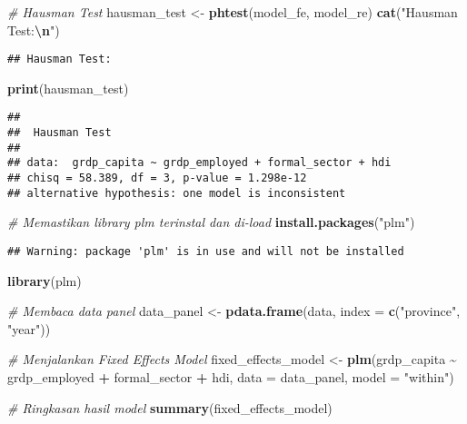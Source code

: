 \documentclass[
]{article}
\newenvironment{Shaded}{\begin{snugshade}}{\end{snugshade}}
\newcommand{\AttributeTok}[1]{\textcolor[rgb]{0.13,0.29,0.53}{#1}}
\newcommand{\CommentTok}[1]{\textcolor[rgb]{0.56,0.35,0.01}{\textit{#1}}}
\newcommand{\FunctionTok}[1]{\textcolor[rgb]{0.13,0.29,0.53}{\textbf{#1}}}
\newcommand{\NormalTok}[1]{#1}
\newcommand{\OtherTok}[1]{\textcolor[rgb]{0.56,0.35,0.01}{#1}}
\newcommand{\SpecialCharTok}[1]{\textcolor[rgb]{0.81,0.36,0.00}{\textbf{#1}}}
\newcommand{\StringTok}[1]{\textcolor[rgb]{0.31,0.60,0.02}{#1}}
\begin{document}
\begin{Shaded}
\begin{Highlighting}[]
\CommentTok{\# Hausman Test}
\NormalTok{hausman\_test }\OtherTok{\textless{}{-}} \FunctionTok{phtest}\NormalTok{(model\_fe, model\_re)}
\FunctionTok{cat}\NormalTok{(}\StringTok{"Hausman Test:}\SpecialCharTok{\textbackslash{}n}\StringTok{"}\NormalTok{)}
\end{Highlighting}
\end{Shaded}

\begin{verbatim}
## Hausman Test:
\end{verbatim}

\begin{Shaded}
\begin{Highlighting}[]
\FunctionTok{print}\NormalTok{(hausman\_test)}
\end{Highlighting}
\end{Shaded}

\begin{verbatim}
## 
##  Hausman Test
## 
## data:  grdp_capita ~ grdp_employed + formal_sector + hdi
## chisq = 58.389, df = 3, p-value = 1.298e-12
## alternative hypothesis: one model is inconsistent
\end{verbatim}

\begin{Shaded}
\begin{Highlighting}[]
\CommentTok{\# Memastikan library plm terinstal dan di{-}load}
\FunctionTok{install.packages}\NormalTok{(}\StringTok{"plm"}\NormalTok{)}
\end{Highlighting}
\end{Shaded}

\begin{verbatim}
## Warning: package 'plm' is in use and will not be installed
\end{verbatim}

\begin{Shaded}
\begin{Highlighting}[]
\FunctionTok{library}\NormalTok{(plm)}

\CommentTok{\# Membaca data panel}
\NormalTok{data\_panel }\OtherTok{\textless{}{-}} \FunctionTok{pdata.frame}\NormalTok{(data, }\AttributeTok{index =} \FunctionTok{c}\NormalTok{(}\StringTok{"province"}\NormalTok{, }\StringTok{"year"}\NormalTok{))}

\CommentTok{\# Menjalankan Fixed Effects Model}
\NormalTok{fixed\_effects\_model }\OtherTok{\textless{}{-}} \FunctionTok{plm}\NormalTok{(grdp\_capita }\SpecialCharTok{\textasciitilde{}}\NormalTok{ grdp\_employed }\SpecialCharTok{+}\NormalTok{ formal\_sector }\SpecialCharTok{+}\NormalTok{ hdi, }
                           \AttributeTok{data =}\NormalTok{ data\_panel, }
                           \AttributeTok{model =} \StringTok{"within"}\NormalTok{)}

\CommentTok{\# Ringkasan hasil model}
\FunctionTok{summary}\NormalTok{(fixed\_effects\_model)}
\end{Highlighting}
\end{Shaded}
\end{document}
